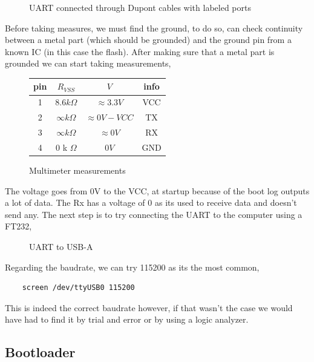 \documentclass{article}
\begin{document}
\begin{figure}[!ht]
	
	\caption{UART connected through Dupont cables with labeled ports}
\end{figure}

\noindent Before taking measures, we must find the ground, to do so, can check continuity between a metal part (which should be grounded) and the ground pin from a known IC (in this case the flash). After making sure that a metal part is grounded we can start taking measurements,
\begin{figure}[!ht]
	\centering
	\begin{tabular}{|c|c|c|c|}
		\hline
		pin & $R_{VSS}$ & $V$ & info \\ 
		\hline
		1 & $8.6k\Omega$ & $\approx 3.3V$ & VCC \\
		2 & $\infty k\Omega$ & $\approx 0V - VCC$ & TX\\
		3 & $\infty k\Omega$ & $\approx 0V$ & RX \\
		4 & $0$ k $\Omega$ & $0V$ & GND \\
		\hline
	\end{tabular}
	\caption{Multimeter measurements}
\end{figure}

\noindent The voltage goes from 0V to the VCC, at startup because of the boot log outputs a lot of data. The Rx has a voltage of 0 as its used to receive data and doesn't send any. The next step is to try connecting the UART to the computer using a FT232, 
\begin{figure}[!ht]
	\centering
	
	\caption{UART to USB-A }
\end{figure}

\noident Regarding the baudrate, we can try 115200 as its the most common,
\begin{lstlisting}
	screen /dev/ttyUSB0 115200
\end{lstlisting} 
This is indeed the correct baudrate however, if that wasn't the case we would have had to find it by trial and error or by using a logic analyzer.
\subsection{Bootloader}
\end{document}
